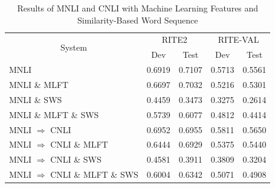 \documentclass[12pt]{article}
\makeatletter
\renewcommand\paragraph{\@startsection{paragraph}{5}{\z@}%
  {3.25ex \@plus1ex \@minus.2ex}%
  {-1em}%
  {\normalfont\normalsize\bfseries}}
\makeatother
\begin{document}
\begin{CJK*}{UTF8}{bkai}
\begin{spacing}{1.77}

\begin{table}[H]
  \centering
  \setlength{\extrarowheight}{-3pt}
  \caption{Results of MNLI and CNLI with Machine Learning Features and Similarity-Based Word Sequence}
  \label{tab:mnli_cnli_mlft_sws}
  \begin{tabular}{|l|r|r|r|r|}
  \hline
  \multicolumn{1}{|c|}{\multirow{2}{*}{System}} & \multicolumn{2}{c|}{RITE2} & \multicolumn{2}{c|}{RITE-VAL} \\ \cline{2-5}
  \multicolumn{1}{|c|}{} & \multicolumn{1}{c|}{Dev} & \multicolumn{1}{c|}{Test} & \multicolumn{1}{c|}{Dev} & \multicolumn{1}{c|}{Test} \\ \hline
  MNLI & 0.6919 & 0.7107 & 0.5713 & 0.5561 \\ \hline
  MNLI \& MLFT & 0.6697 & 0.7032 & 0.5216 & 0.5301 \\ \hline
  MNLI \& SWS & 0.4459 & 0.3473 & 0.3275 & 0.2614 \\ \hline
  MNLI \& MLFT \& SWS & 0.5739 & 0.6077 & 0.4812 & 0.4414 \\ \hline \hline
  MNLI $\Rightarrow$ CNLI & 0.6952 & 0.6955 & 0.5811 & 0.5650 \\ \hline
  MNLI $\Rightarrow$ CNLI \& MLFT & 0.6444 & 0.6929 & 0.5375 & 0.5440 \\ \hline
  MNLI $\Rightarrow$ CNLI \& SWS & 0.4581 & 0.3911 & 0.3809 & 0.3204 \\ \hline
  MNLI $\Rightarrow$ CNLI \& MLFT \& SWS & 0.6004 & 0.6342 & 0.5071 & 0.4908 \\ \hline
  \end{tabular}
\end{table}


\end{spacing}
\end{CJK*}
\end{document}
